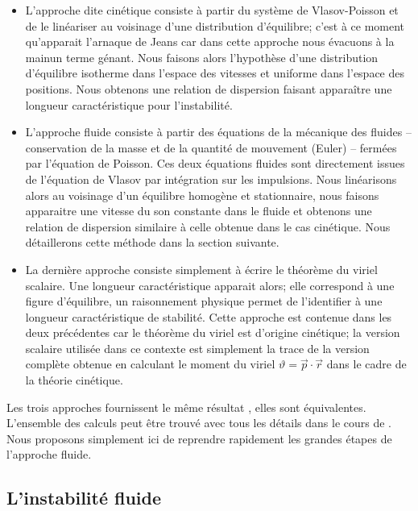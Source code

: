 \begin{itemize}

	\item L'approche dite cinétique consiste à partir du système de Vlasov-Poisson et de le linéariser au voisinage d'une distribution
		d'équilibre; c'est à ce moment qu'apparait l'arnaque de Jeans car dans cette approche nous évacuons \og à la main\fg un terme génant.
		Nous faisons alors l'hypothèse d'une distribution d'équilibre isotherme dans l'espace des vitesses et uniforme dans l'espace des
		positions. Nous obtenons une relation de dispersion faisant apparaître une longueur caractéristique pour l'instabilité.

	\item L'approche fluide consiste à partir des équations de la mécanique des fluides  -- conservation de la masse et de la quantité de
		mouvement (Euler) -- fermées par l'équation de Poisson. Ces deux équations fluides sont directement issues de l'équation de Vlasov par
		intégration sur les impulsions. Nous linéarisons alors au voisinage d'un équilibre homogène et stationnaire, nous faisons apparaitre
		une vitesse du son constante dans le fluide et obtenons une relation de dispersion similaire à celle obtenue dans le cas
		cinétique. Nous détaillerons cette méthode dans la section suivante.

	\item La dernière approche consiste simplement à écrire le théorème du viriel scalaire. Une longueur caractéristique apparait alors; elle
		correspond  à une figure d'équilibre, un raisonnement physique permet de l'identifier à une longueur caractéristique de stabilité.
		Cette approche est contenue dans les deux précédentes car le théorème du viriel est d'origine cinétique; la version scalaire utilisée
		dans ce contexte est simplement la trace de la version complète obtenue en calculant le moment du viriel $\vartheta=\vec p \cdot \vec
		r$ dans le cadre de la théorie cinétique.

\end{itemize}

Les trois approches fournissent le même résultat
, elles sont
équivalentes. L'ensemble des calculs peut être trouvé avec tous les détails dans le cours de \cite{CoursJP}. Nous proposons simplement ici
de reprendre rapidement les grandes étapes de l'approche fluide.

\subsection{L'instabilité fluide}

